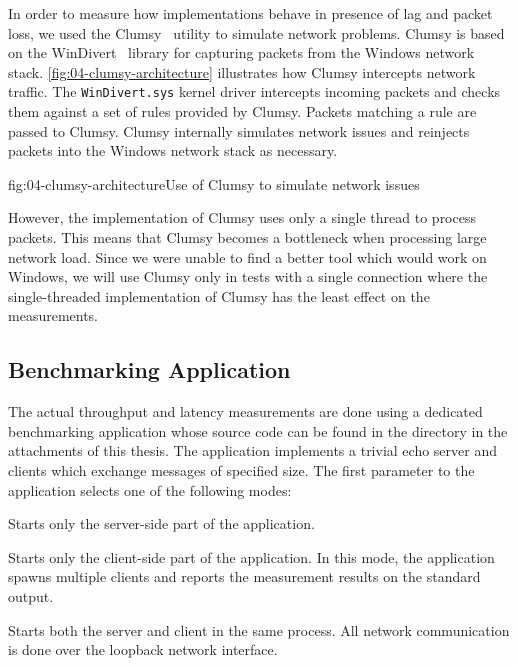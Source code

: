 In order to measure how implementations behave in presence of lag and packet loss, we used the
Clumsy~\cite{clumsy} utility to simulate network problems. Clumsy is based on the
WinDivert~\cite{WinDivert} library for capturing packets from the Windows network stack.
\autoref{fig:04-clumsy-architecture} illustrates how Clumsy intercepts network traffic. The
\texttt{WinDivert.sys} kernel driver intercepts incoming packets and checks them against a set of
rules provided by Clumsy. Packets matching a rule are passed to Clumsy. Clumsy internally simulates
network issues and reinjects packets into the Windows network stack as necessary.

\begin{myFigure}{fig:04-clumsy-architecture}{Use of Clumsy to simulate network issues}

  \resizebox{0.8\linewidth}{!}{}

\end{myFigure}

However, the implementation of Clumsy uses only a single thread to process packets. This means that
Clumsy becomes a bottleneck when processing large network load.  Since we were unable to find a better tool which would work on
Windows, we will use Clumsy only in tests with a single connection where the single-threaded
implementation of Clumsy has the least effect on the measurements.

\subsection{Benchmarking Application}\label{sec:04-benchmark-app}

The actual throughput and latency measurements are done using a dedicated benchmarking \dotnet{}
application whose source code can be found in the
 directory in the attachments of this thesis.
The application implements a trivial echo server and clients which exchange messages of specified
size. The first parameter to the application selects one of the following modes:

\begin{description}

   Starts only the server-side part of the application.

   Starts only the client-side part of the application. In this mode, the
application spawns multiple clients and reports the measurement results on the standard output.

   Starts both the server and client in the same process. All network
communication is done over the loopback network interface.

\end{description}

